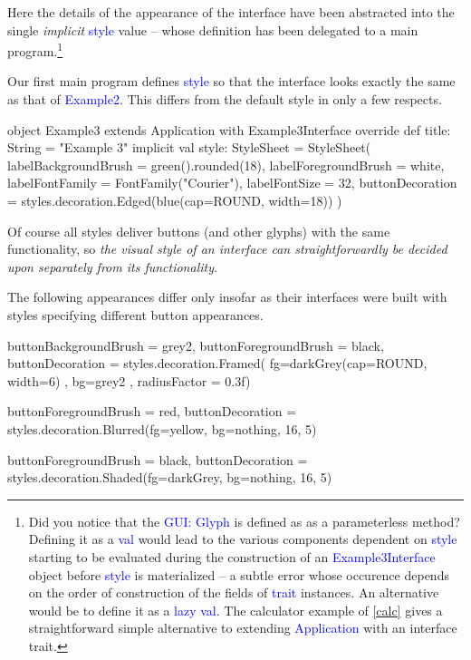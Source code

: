 \documentclass[12pt,a4paper]{article}
\def\Scala#1{\textcolor{blue}{\textsf{#1}}}
\begin{document}
Here the details of the appearance of the interface have been
abstracted into the single \textit{implicit } \Scala{style} value
-- whose definition has been delegated to a main program.\footnote{
Did you notice that the  \Scala{GUI: Glyph} is defined as as a
parameterless method?  Defining it as a \Scala{val} would lead
to the various components dependent on \Scala{style} starting to be evaluated
during the construction of an \Scala{Example3Interface} object
before \Scala{style} is materialized -- a subtle error
whose occurence depends on the order of construction of
the fields of \Scala{trait} instances. An alternative would be
to define it as a \Scala {lazy val}. The calculator example of \ref{calc} gives
a straightforward simple alternative to extending \Scala{Application} with
an interface trait.}

\begin{center}
\end{center}

Our first main program defines \Scala{style} so that the
interface looks exactly the same as that of \Scala{Example2}.
This differs from the default style in only a few respects.
\begin{scala}
object Example3 extends Application with Example3Interface  {
    override def title: String = "Example 3"
    implicit val style: StyleSheet = StyleSheet(
      labelBackgroundBrush  = green().rounded(18),
      labelForegroundBrush  = white,
      labelFontFamily       = FontFamily("Courier"),
      labelFontSize         = 32,
      buttonDecoration = styles.decoration.Edged(blue(cap=ROUND, width=18))
    )
}
\end{scala}

Of course all styles deliver buttons (and other glyphs) with the
same functionality, so \textit{ the  visual style of an interface can
straightforwardly be decided upon separately from its functionality}.

The following appearances differ only insofar as their interfaces
were built with styles specifying different button appearances. 

\begin{center}
\begin{scala}
    buttonBackgroundBrush = grey2,
    buttonForegroundBrush = black,
    buttonDecoration =
      styles.decoration.Framed( fg=darkGrey(cap=ROUND, width=6)
                              , bg=grey2
                              , radiusFactor = 0.3f)
\end{scala}

\begin{scala}
  buttonForegroundBrush = red,
  buttonDecoration =
    styles.decoration.Blurred(fg=yellow, bg=nothing, 16, 5)
\end{scala}

\begin{scala}
  buttonForegroundBrush = black,
  buttonDecoration =
    styles.decoration.Shaded(fg=darkGrey, bg=nothing, 16, 5)
\end{scala}
\end{center}
\end{document}
